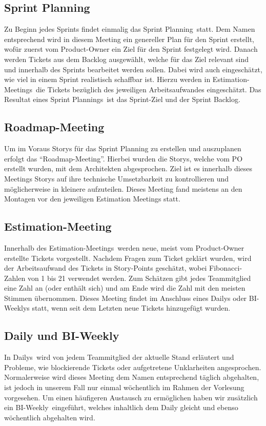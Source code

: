 \subsection{Sprint Planning}
Zu Beginn jedes Sprints findet einmalig das \glqq Sprint Planning\grqq~statt. Dem Namen entsprechend wird in diesem Meeting ein genereller Plan 
für den Sprint erstellt, wofür zuerst vom Product-Owner ein Ziel für den Sprint festgelegt wird. Danach werden Tickets aus dem Backlog 
ausgewählt, welche für das Ziel relevant sind und innerhalb des Sprints bearbeitet werden sollen. Dabei wird auch eingeschätzt, wie viel in einem 
Sprint realistisch schaffbar ist. Hierzu werden in \glqq Estimation-Meetings\grqq~die Tickets bezüglich des jeweiligen Arbeitsaufwandes eingeschätzt.
Das Resultat eines \glqq Sprint Plannings\grqq~ist das Sprint-Ziel und der Sprint Backlog.

\subsection{Roadmap-Meeting}
Um im Voraus Storys für das Sprint Planning zu erstellen und auszuplanen erfolgt das \enquote{Roadmap-Meeting}.
Hierbei wurden die Storys, welche vom PO erstellt wurden, mit dem Architekten abgesprochen.
Ziel ist es innerhalb dieses Meetings Storys auf ihre technische Umsetzbarkeit zu kontrollieren und möglicherweise in kleinere aufzuteilen.
Dieses Meeting fand meistens an den Montagen vor den jeweiligen Estimation Meetings statt.

\subsection{Estimation-Meeting}
Innerhalb des \glqq Estimation-Meetings\grqq~werden neue, meist vom Product-Owner erstellte Tickets vorgestellt. Nachdem Fragen zum Ticket
geklärt wurden, wird der Arbeitsaufwand des Tickets in Story-Points geschätzt, wobei Fibonacci-Zahlen von 1 bis 21 verwendet werden. Zum Schätzen
gibt jedes Teammitglied eine Zahl an (oder enthält sich) und am Ende wird die Zahl mit den meisten Stimmen übernommen. 
Dieses Meeting findet im Anschluss eines Dailys oder BI-Weeklys statt, wenn seit dem Letzten neue Tickets hinzugefügt wurden.

\subsection{Daily und BI-Weekly}
In \glqq Dailys\grqq~wird von jedem Teammitglied der aktuelle Stand erläutert und Probleme, wie blockierende Tickets oder aufgetretene 
Unklarheiten angesprochen. Normalerweise wird dieses Meeting dem Namen entsprechend täglich abgehalten, ist jedoch in unserem Fall nur einmal 
wöchentlich im Rahmen der Vorlesung vorgesehen. Um einen häufigeren Austausch zu ermöglichen haben wir zusätzlich ein 
\glqq BI-Weekly\grqq~eingeführt, welches inhaltlich dem Daily gleicht und ebenso wöchentlich abgehalten wird.


